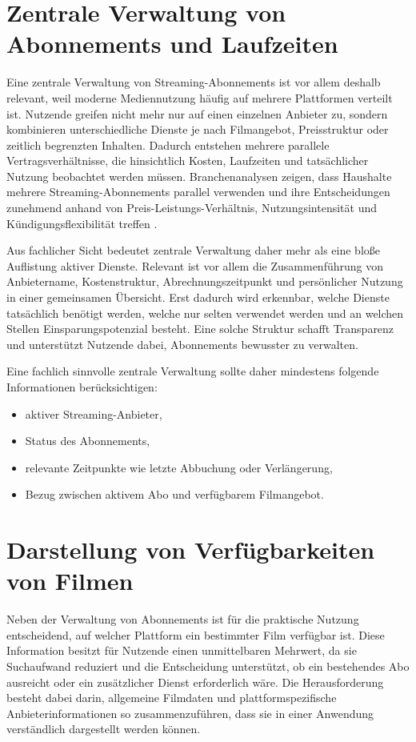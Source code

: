 \section{Zentrale Verwaltung von Abonnements und Laufzeiten}
Eine zentrale Verwaltung von Streaming-Abonnements ist vor allem deshalb relevant, weil moderne Mediennutzung häufig auf mehrere Plattformen verteilt ist. Nutzende greifen nicht mehr nur auf einen einzelnen Anbieter zu, sondern kombinieren unterschiedliche Dienste je nach Filmangebot, Preisstruktur oder zeitlich begrenzten Inhalten. Dadurch entstehen mehrere parallele Vertragsverhältnisse, die hinsichtlich Kosten, Laufzeiten und tatsächlicher Nutzung beobachtet werden müssen. Branchenanalysen zeigen, dass Haushalte mehrere Streaming-Abonnements parallel verwenden und ihre Entscheidungen zunehmend anhand von Preis-Leistungs-Verhältnis, Nutzungsintensität und Kündigungsflexibilität treffen \cite{deloitte_digital_media_2025}.

Aus fachlicher Sicht bedeutet zentrale Verwaltung daher mehr als eine bloße Auflistung aktiver Dienste. Relevant ist vor allem die Zusammenführung von Anbietername, Kostenstruktur, Abrechnungszeitpunkt und persönlicher Nutzung in einer gemeinsamen Übersicht. Erst dadurch wird erkennbar, welche Dienste tatsächlich benötigt werden, welche nur selten verwendet werden und an welchen Stellen Einsparungspotenzial besteht. Eine solche Struktur schafft Transparenz und unterstützt Nutzende dabei, Abonnements bewusster zu verwalten.

Eine fachlich sinnvolle zentrale Verwaltung sollte daher mindestens folgende Informationen berücksichtigen:
\begin{itemize}
    \item aktiver Streaming-Anbieter,
    \item Status des Abonnements,
    \item relevante Zeitpunkte wie letzte Abbuchung oder Verlängerung,
    \item Bezug zwischen aktivem Abo und verfügbarem Filmangebot.
\end{itemize}

\section{Darstellung von Verfügbarkeiten von Filmen}
Neben der Verwaltung von Abonnements ist für die praktische Nutzung entscheidend, auf welcher Plattform ein bestimmter Film verfügbar ist. Diese Information besitzt für Nutzende einen unmittelbaren Mehrwert, da sie Suchaufwand reduziert und die Entscheidung unterstützt, ob ein bestehendes Abo ausreicht oder ein zusätzlicher Dienst erforderlich wäre. Die Herausforderung besteht dabei darin, allgemeine Filmdaten und plattformspezifische Anbieterinformationen so zusammenzuführen, dass sie in einer Anwendung verständlich dargestellt werden können.


